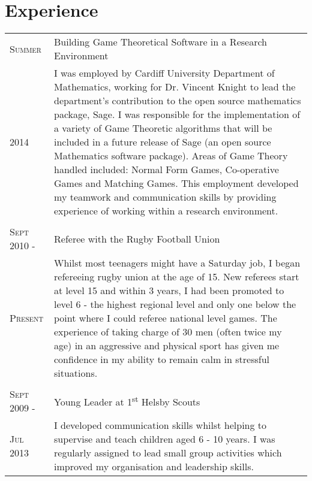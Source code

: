 \documentclass[a4paper]{article}
\begin{document}
\section{Experience}
\begin{tabularx}{\textwidth}{lX}

\textsc{Summer} & Building Game Theoretical Software in a Research Environment \\
\textsc{2014}& \footnotesize{I was employed by Cardiff University Department of Mathematics, working for Dr. Vincent Knight to lead the department's contribution to the open source mathematics package, Sage.
I was responsible for the implementation of a variety of Game Theoretic algorithms that will be included in a future release of Sage (an open source Mathematics software package).
Areas of Game Theory handled included: Normal Form Games, Co-operative Games and Matching Games.
This employment developed my teamwork and communication skills by providing experience of working within a research environment.}\\
\\
\textsc{Sept 2010 -} & Referee with the Rugby Football Union \\
\textsc{Present} & \footnotesize{Whilst most teenagers might have a Saturday job, I began refereeing rugby union at the age of 15.
New referees start at level 15 and within 3 years, I had been promoted to level 6 - the highest regional level and only one below the point where I could referee national level games.
The experience of taking charge of 30 men (often twice my age) in an aggressive and physical sport has given me confidence in my ability to remain calm in stressful situations.}\\
\\
\textsc{Sept 2009 -} & Young Leader at 1\textsuperscript{st} Helsby Scouts\\
\textsc{Jul 2013}& \footnotesize{I developed communication skills whilst helping to supervise and teach children aged 6 - 10 years.
I was regularly assigned to lead small group activities which improved my organisation and leadership skills.}\\

\end{tabularx}
\end{document}
